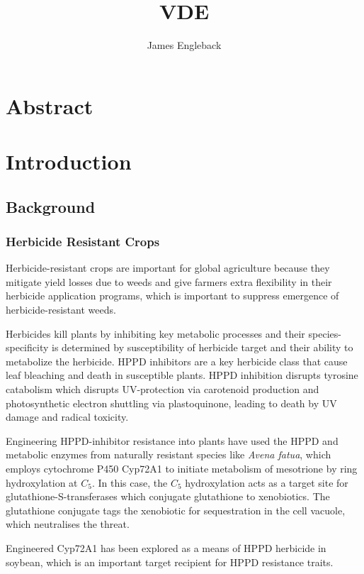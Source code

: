 \documentclass[16pt]{article}
\author{James Engleback}
\begin{document}
\title{\textbf{VDE}}
\maketitle
\tableofcontents

\section{Abstract}
\section{Introduction}

\subsection{Background}
\subsubsection{Herbicide Resistant Crops}
Herbicide-resistant crops are important for global agriculture because they mitigate yield losses due to weeds and give farmers extra flexibility in their herbicide application programs, which is important to suppress emergence of herbicide-resistant weeds. 

Herbicides kill plants by inhibiting key metabolic processes and their species-specificity is determined by susceptibility of herbicide target and their ability to  metabolize the herbicide. %
HPPD inhibitors are a key herbicide class that cause leaf bleaching and death in susceptible plants. 
HPPD inhibition  disrupts tyrosine catabolism which disrupts UV-protection via carotenoid production and photosynthetic electron shuttling via plastoquinone, leading to death by UV damage and radical toxicity. %

Engineering HPPD-inhibitor resistance into plants have used the HPPD and metabolic enzymes from naturally resistant species like \textit{Avena fatua}, which employs cytochrome P450 Cyp72A1  to initiate metabolism of mesotrione by ring hydroxylation at $C_5$.
In this case, the $C_5$ hydroxylation acts as a target site for glutathione-S-transferases which conjugate glutathione to xenobiotics.
The glutathione conjugate tags the xenobiotic for sequestration in the cell vacuole, which neutralises the threat.

Engineered Cyp72A1 has been explored as a means of HPPD herbicide in soybean, which is an important target recipient for HPPD resistance traits. %
\end{document}
